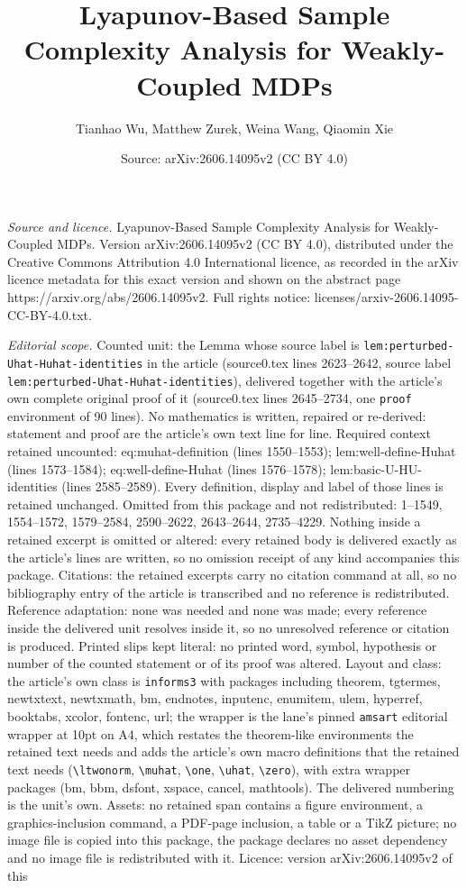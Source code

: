 \documentclass[10pt,a4paper]{amsart}
\title[Lyapunov-Based Sample Complexity Analysis for Weakly-Coupled]{Lyapunov-Based Sample Complexity Analysis for Weakly-Coupled MDPs}
\author{Tianhao Wu, Matthew Zurek, Weina Wang, Qiaomin Xie}
\date{Source: arXiv:2606.14095v2 (CC BY 4.0)}
\begin{document}
\maketitle

\noindent\emph{Source and licence.} Lyapunov-Based Sample Complexity Analysis for Weakly-Coupled MDPs. Version arXiv:2606.14095v2 (CC BY 4.0), distributed under the Creative Commons Attribution 4.0 International licence, as recorded in the arXiv licence metadata for this exact version and shown on the abstract page https://arxiv.org/abs/2606.14095v2. Full rights notice: licenses/arxiv-2606.14095-CC-BY-4.0.txt.\par\smallskip

\noindent\textit{Editorial scope.} Counted unit: the Lemma whose source label is \texttt{lem:perturbed-Uhat-Huhat-identities} in the article (source0.tex lines 2623--2642, source label \texttt{lem:perturbed-Uhat-Huhat-identities}), delivered together with the article's own complete original proof of it (source0.tex lines 2645--2734, one \texttt{proof} environment of 90 lines). No mathematics is written, repaired or re-derived: statement and proof are the article's own text line for line. Required context retained uncounted: eq:muhat-definition (lines 1550--1553); lem:well-define-Huhat (lines 1573--1584); eq:well-define-Huhat (lines 1576--1578); lem:basic-U-HU-identities (lines 2585--2589). Every definition, display and label of those lines is retained unchanged. Omitted from this package and not redistributed: 1--1549, 1554--1572, 1579--2584, 2590--2622, 2643--2644, 2735--4229. Nothing inside a retained excerpt is omitted or altered: every retained body is delivered exactly as the article's lines are written, so no omission receipt of any kind accompanies this package. Citations: the retained excerpts carry no citation command at all, so no bibliography entry of the article is transcribed and no reference is redistributed. Reference adaptation: none was needed and none was made; every reference inside the delivered unit resolves inside it, so no unresolved reference or citation is produced. Printed slips kept literal: no printed word, symbol, hypothesis or number of the counted statement or of its proof was altered. Layout and class: the article's own class is \texttt{informs3} with packages including theorem, tgtermes, newtxtext, newtxmath, bm, endnotes, inputenc, enumitem, ulem, hyperref, booktabs, xcolor, fontenc, url; the wrapper is the lane's pinned \texttt{amsart} editorial wrapper at 10pt on A4, which restates the theorem-like environments the retained text needs and adds the article's own macro definitions that the retained text needs (\texttt{\textbackslash ltwonorm}, \texttt{\textbackslash muhat}, \texttt{\textbackslash one}, \texttt{\textbackslash uhat}, \texttt{\textbackslash zero}), with extra wrapper packages (bm, bbm, dsfont, xspace, cancel, mathtools). The delivered numbering is the unit's own. Assets: no retained span contains a figure environment, a graphics-inclusion command, a PDF-page inclusion, a table or a TikZ picture; no image file is copied into this package, the package declares no asset dependency and no image file is redistributed with it. Licence: version arXiv:2606.14095v2 of this 
\end{document}
